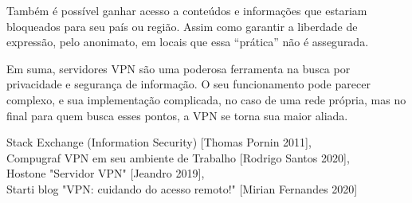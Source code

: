 \documentclass[12pt]{article}
\begin{document}
\begin{flushleft}
Também é possível ganhar acesso a conteúdos e informações que estariam bloqueados para seu país ou região. Assim como garantir a liberdade de expressão, pelo anonimato, em locais que essa “prática” não é assegurada. 

Em suma, servidores VPN são uma poderosa ferramenta na busca por privacidade e segurança de informação. O seu funcionamento pode parecer complexo, e sua implementação complicada, no caso de uma rede própria, mas no final para quem busca esses pontos, a VPN se torna sua maior aliada.






Stack Exchange (Information Security) [Thomas Pornin 2011],\\
Compugraf VPN em seu ambiente de Trabalho [Rodrigo Santos 2020], \\
Hostone "Servidor VPN" [Jeandro 2019],\\
Starti blog "VPN: cuidando do acesso remoto!" [Mirian Fernandes 2020]\\

\end{flushleft}
\end{document}
